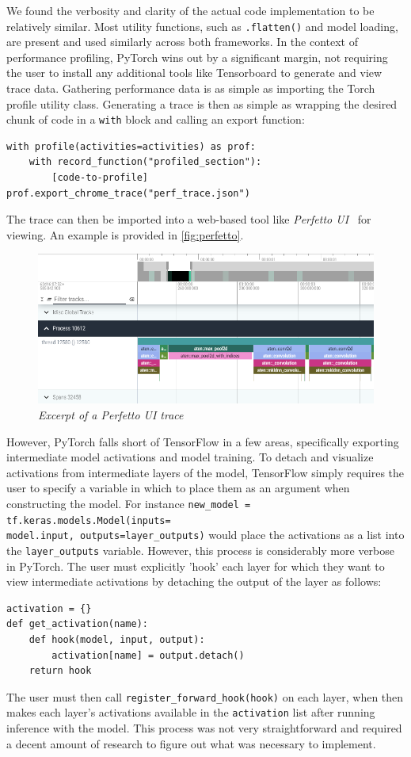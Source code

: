 \documentclass[letterpaper,twocolumn,10pt]{article}
\begin{document}
We found the verbosity and clarity of the actual code implementation to be relatively similar. Most utility functions, such as \verb|.flatten()| and model loading, are present and used similarly across both frameworks. In the context of performance profiling, PyTorch wins out by a significant margin, not requiring the user to install any additional tools like Tensorboard to generate and view trace data. Gathering performance data is as simple as importing the Torch profile utility class. Generating a trace is then as simple as wrapping the desired chunk of code in a \verb|with| block and calling an export function:
\begin{verbatim}
with profile(activities=activities) as prof:
    with record_function("profiled_section"):
        [code-to-profile]
prof.export_chrome_trace("perf_trace.json")
\end{verbatim}
The trace can then be imported into a web-based tool like \textit{Perfetto UI}~\cite{perfetto} for viewing. An example is provided in \autoref{fig:perfetto}.
\begin{figure}[ht]
    \centering
    \includegraphics[width=1.07\linewidth]{Figures/perfetto.png}
    \caption{\textit{Excerpt of a Perfetto UI trace}}
    \label{fig:perfetto}
\end{figure}

However, PyTorch falls short of TensorFlow in a few areas, specifically exporting intermediate model activations and model training. To detach and visualize activations from intermediate layers of the model, TensorFlow simply requires the user to specify a variable in which to place them as an argument when constructing the model. For instance \verb|new_model = tf.keras.models.Model(inputs=|\\\verb|model.input, outputs=layer_outputs)| would place the activations as a list into the \verb|layer_outputs| variable. However, this process is considerably more verbose in PyTorch. The user must explicitly 'hook' each layer for which they want to view intermediate activations by detaching the output of the layer as follows:
\begin{verbatim}
activation = {}
def get_activation(name):
    def hook(model, input, output):
        activation[name] = output.detach()
    return hook
\end{verbatim}
The user must then call \verb|register_forward_hook(hook)| on each layer, when then makes each layer's activations available in the \verb|activation| list after running inference with the model. This process was not very straightforward and required a decent amount of research to figure out what was necessary to implement. 
\end{document}
